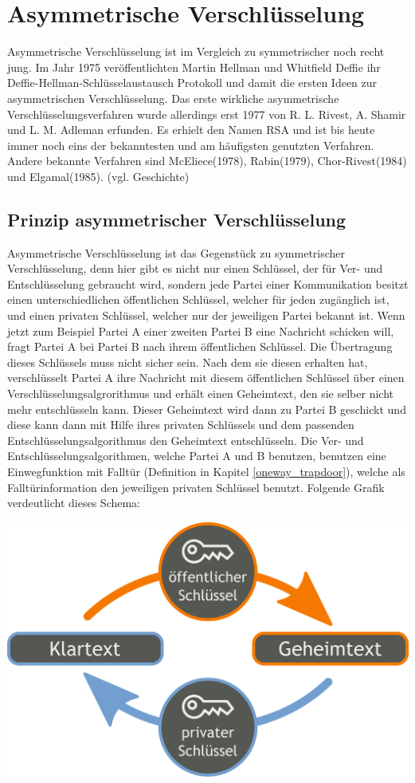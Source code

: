 \documentclass[a4paper,12pt,titlepage]{article}
\begin{document}
\section{Asymmetrische Verschlüsselung}\label{asymm}
Asymmetrische Verschlüsselung ist im Vergleich zu symmetrischer noch recht jung. Im Jahr 1975 veröffentlichten Martin Hellman und Whitfield Deffie ihr Deffie-Hellman-Schlüsselaustausch Protokoll und damit die ersten Ideen zur asymmetrischen Verschlüsselung. Das erste wirkliche asymmetrische Verschlüsselungsverfahren wurde allerdings erst 1977 von R. L. Rivest, A. Shamir und L. M. Adleman erfunden. Es erhielt den Namen RSA und ist bis heute immer noch eins der bekanntesten und am häufigsten genutzten Verfahren. Andere bekannte Verfahren sind McEliece(1978), Rabin(1979), Chor-Rivest(1984) und Elgamal(1985). (vgl. \cite{asymm_gesch} Geschichte)
\subsection{Prinzip asymmetrischer Verschlüsselung}\label{asymm:prinzip}
Asymmetrische Verschlüsselung ist das Gegenstück zu symmetrischer Verschlüsselung, denn hier gibt es nicht nur einen Schlüssel, der für Ver- und Entschlüsselung gebraucht wird, sondern jede Partei einer Kommunikation besitzt einen unterschiedlichen öffentlichen Schlüssel, welcher für jeden zugänglich ist, und einen privaten Schlüssel, welcher nur der jeweiligen Partei bekannt ist. Wenn jetzt zum Beispiel Partei A einer zweiten Partei B eine Nachricht schicken will, fragt Partei A bei Partei B nach ihrem öffentlichen Schlüssel. Die Übertragung dieses Schlüssels muss nicht sicher sein. Nach dem sie diesen erhalten hat, verschlüsselt Partei A ihre Nachricht mit diesem öffentlichen Schlüssel über einen Verschlüsselungsalgrorithmus und erhält einen Geheimtext, den sie selber nicht mehr entschlüsseln kann. Dieser Geheimtext wird dann zu Partei B geschickt und diese kann dann mit Hilfe ihres privaten Schlüssels und dem passenden Entschlüsselungsalgorithmus den Geheimtext entschlüsseln. Die Ver- und Entschlüsselungsalgorithmen, welche Partei A und B benutzen, benutzen eine Einwegfunktion mit Falltür (Definition in Kapitel \ref{oneway_trapdoor}), welche als Falltürinformation den jeweiligen privaten Schlüssel benutzt. \newline Folgende Grafik verdeutlicht dieses Schema:
\begin{center}
\includegraphics[scale=0.2]{asymm_shema.png} %
\end{center}
\end{document}

